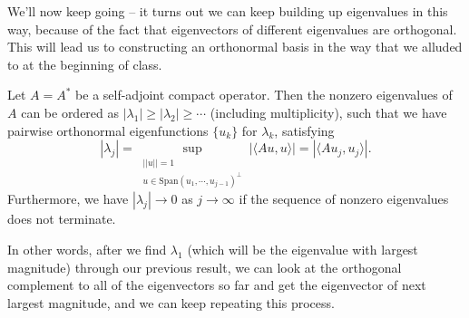 We'll now keep going -- it turns out we can keep building up eigenvalues in this way, because of the fact that eigenvectors of different eigenvalues are orthogonal. This will lead us to constructing an orthonormal basis in the way that we alluded to at the beginning of class.

\begin{theorem}
Let $A = A^\ast$ be a self-adjoint compact operator. Then the nonzero eigenvalues of $A$ can be ordered as $|\lambda_1| \ge |\lambda_2| \ge \cdots$ (including multiplicity), such that we have pairwise orthonormal eigenfunctions $\{u_k\}$ for $\lambda_k$, satisfying 
\[
    |\lambda_j| = \sup_{\substack{||u|| = 1 \\ u \in \text{Span}(u_1, \cdots, u_{j-1})^\perp}} |\langle Au, u \rangle| = |\langle Au_j, u_j \rangle|.
\]
Furthermore, we have $|\lambda_j| \to 0$ as $j \to \infty$ if the sequence of nonzero eigenvalues does not terminate.
\end{theorem}

In other words, after we find $\lambda_1$ (which will be the eigenvalue with largest magnitude) through our previous result, we can look at the orthogonal complement to all of the eigenvectors so far and get the eigenvector of next largest magnitude, and we can keep repeating this process.

